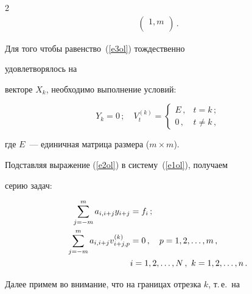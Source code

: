 \begin{multicols}{2}
\begin{align*}
\begin{pmatrix}
{1,m}\\


     \end{pmatrix}


     \,.


     \end{align*}


         


     Для того чтобы равенство~(\ref{e3ol}) тождественно %


      удов\-ле\-тво\-ря\-лось на


векторе $X_k$, необходимо выполнение условий:


     \begin{equation}


     Y_k = 0\,;\quad


     V_t^{(k)} =


     \begin{cases}


     E\,, & t=k\,;\\


     0\,, & t\not= k\,,


     \end{cases}


     \label{e4ol}


     \end{equation}


где     $E$~--- единичная матрица размера ($m\times m$).





     Подставляя выражение (\ref{e2ol}) в систему~(\ref{e1ol}), получаем


серию задач:


     \begin{align}


     \sum\limits_{j=-m}^m a_{i,i+j} y_{i+j} & = f_i\,;\notag\\


     \sum\limits_{j=-m}^m a_{i,i+j} v^{(k)}_{i+j,p} & = 0\,,\quad p=1, 2, \ldots ,


m\,,\label{e5ol}\\ &i=1, 2, \ldots , N\,,\ k=1, 2, \ldots , n\,.\notag


     \end{align}





     Далее примем во внимание, что на границах отрезка $k$, т.\,е.\ на



\end{multicols}
